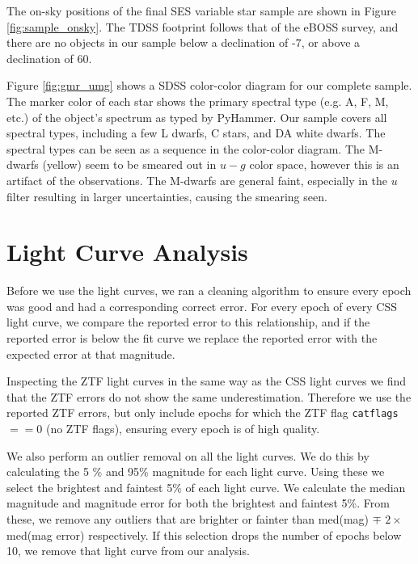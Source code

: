 \documentclass[twocolumn, tighten, astrosymb]{aastex631}
\begin{document}
The on-sky positions of the final SES variable star sample are shown in Figure \ref{fig:sample_onsky}. The TDSS footprint follows that of the eBOSS survey, and there are no objects in our sample below a declination of -7\degr, or above a declination of 60\degr.

Figure \ref{fig:gmr_umg} shows a SDSS color-color diagram for our complete sample. The marker color of each star shows the primary spectral type (e.g. A, F, M, etc.) of the object's spectrum as typed by PyHammer. Our sample covers all spectral types, including a few L dwarfs, C stars, and DA white dwarfs. The spectral types can be seen as a sequence in the color-color diagram. The M-dwarfs (yellow) seem to be smeared out in $u-g$ color space, however this is an artifact of the observations. The M-dwarfs are general faint, especially in the $u$ filter resulting in larger uncertainties, causing the smearing seen. 

\section{Light Curve Analysis} \label{sec:lc_analysis}

Before we use the light curves, we ran a cleaning algorithm to ensure every epoch was good and had a corresponding correct error.
For every epoch of every CSS light curve, we compare the reported error to this relationship, and if the reported error is below the fit curve we replace the reported error with the expected error at that magnitude. 

Inspecting the ZTF light curves in the same way as the CSS light curves we find that the ZTF errors do not show the same underestimation. Therefore we use the reported ZTF errors, but only include epochs for which the ZTF flag \texttt{catflags} $ == 0$ (no ZTF flags), ensuring every epoch is of high quality.

We also perform an outlier removal on all the light curves. We do this by calculating the 5 \% and 95\% magnitude for each light curve. Using these we select the brightest and faintest 5\% of each light curve. We calculate the median magnitude and magnitude error for both the brightest and faintest 5\%. From these, we remove any outliers that are brighter or fainter than med(mag) $\mp$ $2\times$med(mag error) respectively. If this selection drops the number of epochs below 10, we remove that light curve from our analysis.
\end{document}

